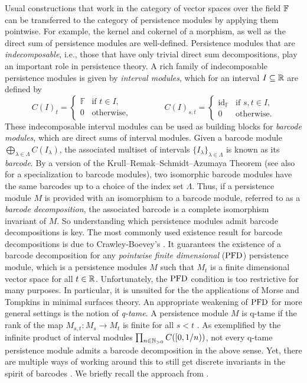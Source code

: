 Usual constructions that work in the category of vector spaces over the field $\mathbb{F}$ can be transferred to the category of persistence modules by applying them pointwise.
For example, the kernel and cokernel of a morphism, as well as the direct sum of persistence modules are well-defined.
Persistence modules that are \emph{indecomposable}, i.e., those that have only trivial direct sum decompositions, play an important role in persistence theory.
A rich family of indecomposable persistence modules is given by \emph{interval modules}, which for an interval $I \subseteq \mathbb{R}$ are defined by
\begin{equation} \label{e:interval module}
    C(I)_t =
    \begin{cases}
        \mathbb{F} & \text{if } t \in I, \\
        0          & \text{otherwise},
    \end{cases}
    \qquad
    \qquad
    C(I)_{s, t} =
    \begin{cases}
        \operatorname{id}_{\mathbb{F}} & \text{if } s, t \in I,\\
        0 & \text{otherwise}.
    \end{cases}    
\end{equation}
These indecomposable interval modules can be used as building blocks for \emph{barcode modules}, which are direct sums of interval modules.
Given a barcode module $\bigoplus_{\lambda \in \Lambda} C(I_{\lambda})$, the associated multiset of intervals $\{I_{\lambda}\}_{\lambda \in \Lambda}$ is known as its \textit{barcode}.
By a version of the Krull--Remak--Schmidt--Azumaya Theorem \cite{MR37832} (see also \cite[Theorem 2.7]{Chazal.2016a} for a specialization to barcode modules), two isomorphic barcode modules have the same barcodes up to a choice of the index set $\Lambda$.
Thus, if a persistence module $M$ is provided with an isomorphism to a barcode module, referred to as a \emph{barcode decomposition}, the associated barcode is a complete isomorphism invariant of $M$.
So understanding which persistence modules admit barcode decompositions is key.
The most commonly used existence result for barcode decompositions is due to Crawley-Boevey's \cite{Crawley-Boevey.2015}.
It guarantees the existence of a barcode decomposition for any \emph{pointwise finite dimensional} ($\mathrm{PFD}$) persistence module, which is a persistence modules $M$ such that $M_t$ is a finite dimensional vector space for all $t \in \mathbb{R}$.
Unfortunately, the $\mathrm{PFD}$ condition is too restrictive for many purposes.
In particular, it is unsuited for the the applications of Morse and Tompkins in minimal surfaces theory.
An appropriate weakening of $\mathrm{PFD}$ for more general settings is the notion of \emph{q-tame}.
A persistence module $M$ is q-tame if the rank of the map $M_{s,t} \colon M_s \to M_t$ is finite for all $s < t$ \cite{Chazal.2016a}.
As exemplified by the infinite product of interval modules $\prod_{n \in \mathbb{N}_{> 0}} C([0,1/n))$, not every q-tame persistence module admits a barcode decomposition in the above sense.
Yet, there are multiple ways of working around this to still get discrete invariants in the spirit of barcodes \cite{Chazal.2016a, Chazal.2016b, schmahl2020structure}.
We briefly recall the approach from \citet{Chazal.2016b}.


